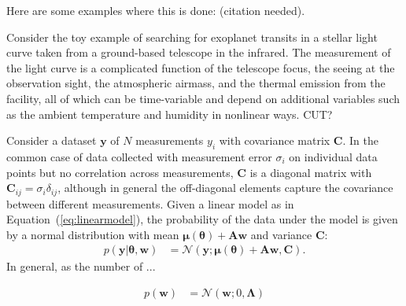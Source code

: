 \documentclass[modern]{rnaastex}
\renewcommand{\eqref}[1]{\ref{eq:#1}}
\newcommand{\Eq}[1]{Equation~(\eqref{#1})}
\newcommand{\eq}[1]{\Eq{#1}}
\newcommand{\bvec}[1]{{\ensuremath{\boldsymbol{#1}}}}
\newcommand{\citeme}{{\color{red}(citation needed)}}
\newcommand{\Normal}{\ensuremath{\mathcal{N}}}
\newcommand{\mA}{\ensuremath{\bvec{A}}}
\newcommand{\mC}{\ensuremath{\bvec{C}}}
\newcommand{\mL}{\ensuremath{\bvec{\Lambda}}}
\newcommand{\vw}{\ensuremath{\bvec{w}}}
\newcommand{\vy}{\ensuremath{\bvec{y}}}
\newcommand{\vt}{\ensuremath{\bvec{\theta}}}
\newcommand{\vm}{\ensuremath{\bvec{\mu}(\bvec{\theta})}}
\begin{document}
Here are some examples where this is done: \citeme.
\citep{Luger:2017,Luger:2016}

Consider the toy example of searching for exoplanet transits in a stellar
light curve taken from a ground-based telescope in the infrared.
The measurement of the light curve is a complicated function of the telescope
focus, the seeing at the observation sight, the atmospheric airmass, and the
thermal emission from the facility, all of which can be time-variable and
depend on additional variables such as the ambient temperature and humidity
in nonlinear ways. {\color{red} CUT?}

Consider a dataset $\vy$ of $N$ measurements $y_i$ with covariance
matrix $\mC$. 
In the common case of data collected with measurement error $\sigma_i$ on 
individual data points but no correlation across measurements, $\mC$ is a 
diagonal matrix with $\mC_{ij} = \sigma_{i}\delta_{ij}$, although in general
the off-diagonal elements capture the covariance between different
measurements. Given a linear model as in \eq{linearmodel}, the probability
of the data under the model is given by a normal distribution with mean 
$\vm + \mA \vw$ and variance $\mC$:
%
\begin{align}
p(\vy | \vt, \vw) &= \Normal(\vy; \vm + \mA \vw, \mC).
\end{align}
In general, as the number of ...

%
\begin{align}
p(\vw) &= \Normal(\vw; 0, \mL) \nonumber
\end{align}
\end{document}
